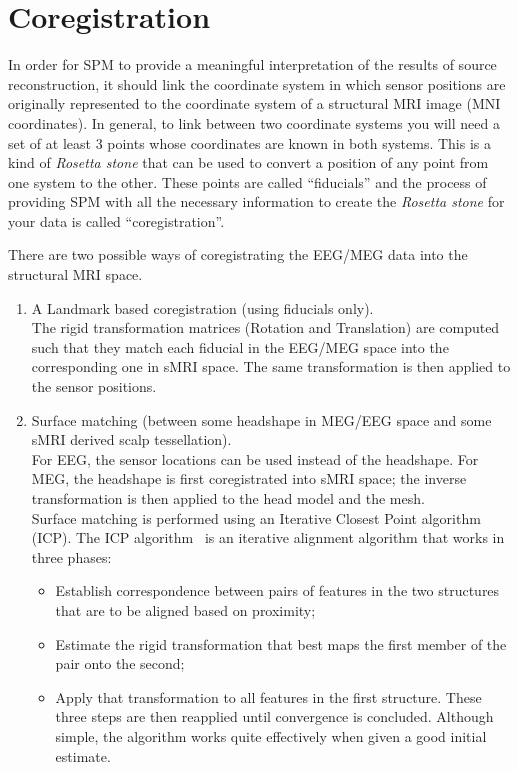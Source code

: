 \section{Coregistration}

In order for SPM to provide a meaningful interpretation of the results of source reconstruction, it should link the coordinate system in which sensor positions are originally represented to the coordinate system of a structural MRI image (MNI coordinates). In general, to link between two coordinate systems you will need a set of at least 3 points whose coordinates are known in both systems. This is a kind of \textit{Rosetta stone} that can be used to convert a position of any point from one system to the other. These points are called ``fiducials'' and the process of providing SPM with all the necessary information to create the \textit{Rosetta stone} for your data is called ``coregistration''.

There are two possible ways of coregistrating the EEG/MEG data into the structural MRI space.

\begin{enumerate}
    \item A Landmark based coregistration (using fiducials only).\\
    The rigid transformation matrices (Rotation and Translation) are computed such that they match each fiducial in the EEG/MEG space into the corresponding one in sMRI space. The same transformation is then applied to the sensor positions.
    \item Surface matching (between some headshape in MEG/EEG space and some sMRI derived scalp tessellation).\\
    For EEG, the sensor locations can be used instead of the headshape. For MEG, the headshape is first coregistrated into sMRI space; the inverse transformation is then applied to the head model and the mesh.\\
Surface matching is performed using an Iterative Closest Point algorithm (ICP). The ICP algorithm~\cite{Besl_McKay} is an iterative alignment algorithm that works in three phases:
\begin{itemize}
    \item Establish correspondence between pairs of features in the two structures that are to be aligned based on proximity;
    \item Estimate the rigid transformation that best maps the first member of the pair onto the second;
    \item Apply that transformation to all features in the first structure. These three steps are then reapplied until convergence is concluded. Although simple, the algorithm works quite effectively when given a good initial estimate.
\end{itemize}
\end{enumerate}

